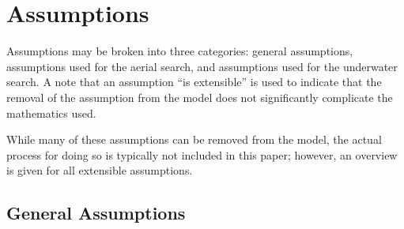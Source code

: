 \section{Assumptions}

Assumptions may be broken into three categories: general assumptions, assumptions used for the aerial search, and assumptions used for the underwater search. A note that an assumption ``is extensible'' is used to indicate that the removal of the assumption from the model does not significantly complicate the mathematics used.

While many of these assumptions can be removed from the model, the actual process for doing so is typically not included in this paper; however, an overview is given for all extensible assumptions.

\subsection{General Assumptions}

